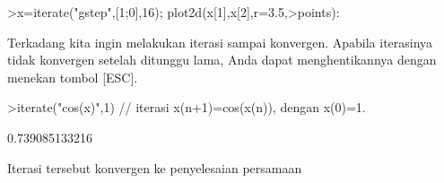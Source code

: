 \documentclass{article}
\begin{document}
\begin{eulernotebook}
\begin{eulercomment}
\begin{eulercomment}
\begin{eulercomment}
\begin{eulercomment}
\begin{eulercomment}
\begin{eulercomment}
\begin{eulerprompt}
>x=iterate("gstep",[1;0],16); plot2d(x[1],x[2],r=3.5,>points):
\end{eulerprompt}
\begin{eulercomment}
\begin{eulercomment}
\begin{eulercomment}
Terkadang kita ingin melakukan iterasi sampai konvergen. Apabila iterasinya tidak konvergen
setelah ditunggu lama, Anda dapat menghentikannya dengan menekan tombol [ESC].
\end{eulercomment}
\begin{eulerprompt}
>iterate("cos(x)",1) // iterasi x(n+1)=cos(x(n)), dengan x(0)=1.
\end{eulerprompt}
\begin{euleroutput}
  0.739085133216
\end{euleroutput}
\begin{eulercomment}
Iterasi tersebut konvergen ke penyelesaian persamaan


\end{eulercomment}
\end{eulercomment}
\end{eulercomment}
\end{eulercomment}
\end{eulercomment}
\end{eulercomment}
\end{eulercomment}
\end{eulercomment}
\end{eulercomment}
\end{eulernotebook}
\end{document}
